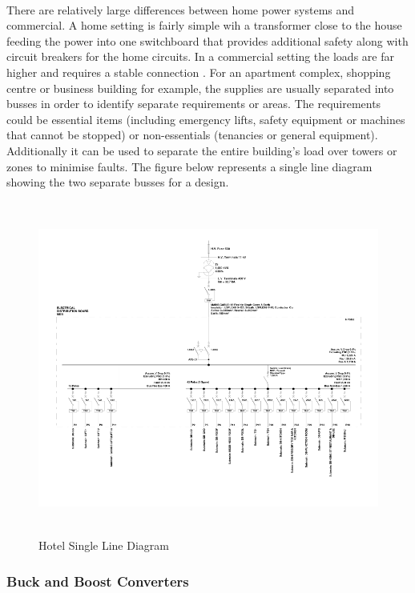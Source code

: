 \paragraph{}
There are relatively large differences between home power systems and commercial. A home setting is fairly simple wih a transformer close to the house feeding the power into one switchboard that provides additional safety along with circuit breakers for the home circuits. In a commercial setting the loads are far higher and requires a stable connection \cite{Baran2003}. For an apartment complex, shopping centre or business building for example, the supplies are usually separated into busses in order to identify separate requirements or areas. The requirements could be essential items (including emergency lifts, safety equipment or machines that cannot be stopped) or non-essentials (tenancies or general equipment). Additionally it can be used to separate the entire building's load over towers or zones to minimise faults. The figure below represents a single line diagram showing the two separate busses for a design. 

\begin{figure}[H]
\hfill\includegraphics[width = 160mm, height = 110mm]{images/PCad_SLD}\hspace*{\fill}
\caption{{Hotel Single Line Diagram}}
\label{fig:SLD}
\end{figure}   

\subsubsection{Buck and Boost Converters}

\paragraph{}

\newpage